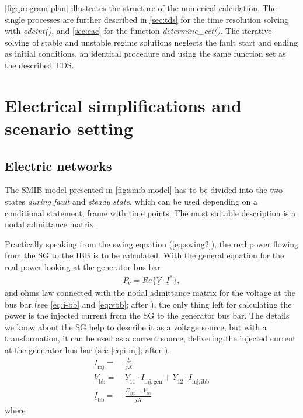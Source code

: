 \autoref{fig:program-plan} illustrates the structure of the numerical calculation. The single processes are further described in \autoref{sec:tds} for the time resolution solving with {\itshape odeint()}, and \autoref{sec:eac} for the function {\itshape determine\_cct()}. 
The iterative solving of stable and unstable regime solutions neglects the fault start and ending as initial conditions, an identical procedure and using the same function set as the described \acs{TDS}.

\section{Electrical simplifications and scenario setting}
\label{sec:scenario}

\subsection{Electric networks}
\label{sec:el-networks}

The \acs{SMIB}-model presented in \autoref{fig:smib-model} has to be divided into the two states {\itshape during fault} and {\itshape steady state}, which can be used depending on a conditional statement, frame with time points. The most suitable description is a nodal admittance matrix.

Practically speaking from the swing equation (\autoref{eq:swing2}), the real power flowing from the \acs{SG} to the \acs{IBB} is to be calculated. With the general equation for the real power \autocite{oedingElektrischeKraftwerkeUnd2016} looking at the generator bus bar
\begin{align}
        P_\mathrm{e}=Re\{\underline{V} \cdot \underline{I}^*\} \nonumber,
\end{align}
and ohms law connected with the nodal admittance matrix for the voltage at the bus bar (see \autoref{eq:i-bb} and \ref{eq:vbb}; after \autocite{oedingElektrischeKraftwerkeUnd2016,machowskiPowerSystemDynamics2020}), the only thing left for calculating the power is the injected current from the \acs{SG} to the generator bus bar. The details we know about the \acs{SG} help to describe it as a voltage source, but with a transformation, it can be used as a current source, delivering the injected current at the generator bus bar (see \autoref{eq:i-inj}; after \autocite{machowskiPowerSystemDynamics2020}).
\begin{align}
        \underline{I}_\mathrm{inj}=&~\frac{\underline{E}}{jX} \label{eq:i-inj} \\[6pt]
        \underline{V}_\mathrm{bb}=&~\underline{Y}_\mathrm{11} \cdot \underline{I}_\mathrm{inj,gen} + \underline{Y}_\mathrm{12} \cdot \underline{I}_\mathrm{inj,ibb} \label{eq:vbb} \\[6pt]
        \underline{I}_\mathrm{bb}=&~\frac{\underline{E}_\mathrm{gen}-\underline{V}_\mathrm{bb}}{jX} \label{eq:i-bb}
\end{align}
where

